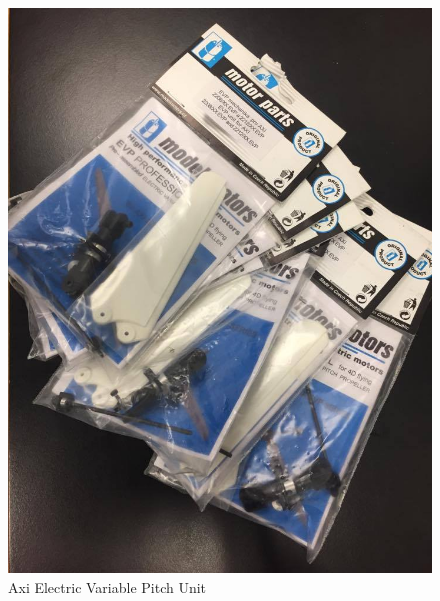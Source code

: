 \begin{figure}[h]
        \centering
         \begin{minipage}[b]{0.4\textwidth}
            \includegraphics[width = 1\textwidth]{VAPIQ-PICTURES/axievp}
              \caption{Axi Electric Variable Pitch Unit}
            \label{fig:evp}
        \end{minipage}
        \hfill
        \begin{minipage}[b]{0.4\textwidth}

\end{minipage}
\end{figure}
